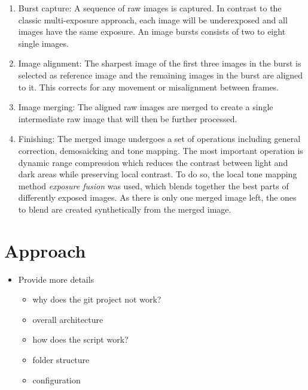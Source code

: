 \documentclass{egpubl}
\begin{document}
\begin{enumerate}
    \item Burst capture: A sequence of raw images is captured. In contrast to the classic 
          multi-exposure approach, each image will be underexposed and all images have the
          same exposure. An image bursts consists of two to eight single images.
    \item Image alignment: The sharpest image of the first three images in the burst is 
          selected as reference image and the remaining images in the burst are aligned 
          to it. This corrects for any movement or misalignment between frames.
    \item Image merging: The aligned raw images are merged to create a single intermediate 
          raw image that will then be further processed.
    \item Finishing: The merged image undergoes a set of operations including general
          correction, demosaicking and tone mapping. The most important operation is
          dynamic range compression which reduces the contrast between light and dark
          areas while preserving local contrast. To do so, the local tone mapping method
          \textit{exposure fusion} was used, which blends together the best parts of
          differently exposed images. As there is only one merged image left, the ones 
          to blend are created synthetically from the merged image.

\end{enumerate}


\section{Approach}
\label{sec:approach}

\begin{itemize}
      \item Provide more details
      \begin{itemize}
            \item why does the git project not work?
            \item overall architecture
            \item how does the script work?
            \item folder structure
            \item configuration
      \end{itemize}
\end{itemize}
\end{document}
